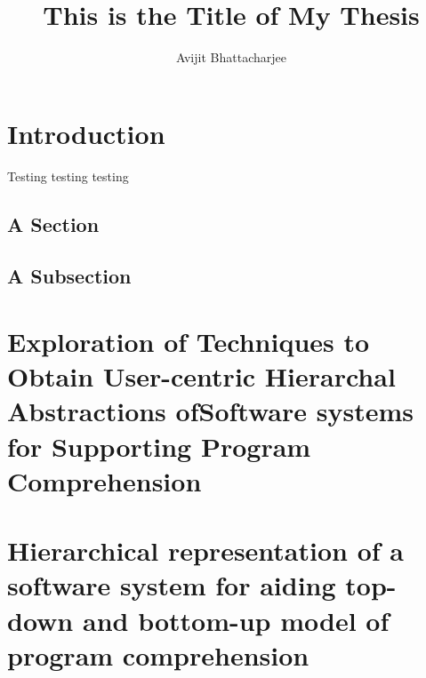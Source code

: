 \documentclass{uofsthesis-cs}
\title{This is the Title of My Thesis}
\author{Avijit Bhattacharjee}
\begin{document}
\maketitle

\frontmatter


\chapter{Introduction}

Testing testing testing 

\section{A Section}

\section{A Subsection}


%
% 
% 
%




\chapter{Exploration of Techniques to Obtain User-centric Hierarchal Abstractions ofSoftware systems for Supporting Program Comprehension}


\chapter{Hierarchical representation of a software system  for aiding top-down and bottom-up model of program comprehension}

\end{document}
